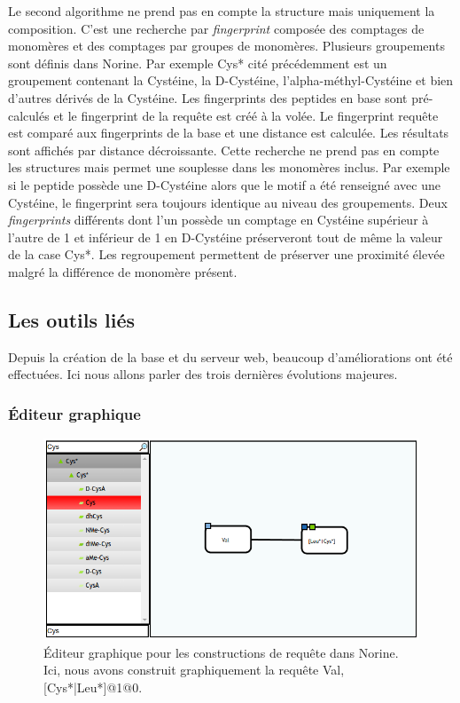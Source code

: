 Le second algorithme ne prend pas en compte la structure mais uniquement la composition.
C'est une recherche par \textit{fingerprint} composée des comptages de monomères et des comptages par groupes de monomères.
Plusieurs groupements sont définis dans Norine.
Par exemple Cys* cité précédemment est un groupement contenant la Cystéine, la D-Cystéine, l'alpha-méthyl-Cystéine et bien d'autres dérivés de la Cystéine.
Les fingerprints des peptides en base sont pré-calculés et le fingerprint de la requête est créé à la volée.
Le fingerprint requête est comparé aux fingerprints de la base et une distance est calculée.
Les résultats sont affichés par distance décroissante.
Cette recherche ne prend pas en compte les structures mais permet une souplesse dans les monomères inclus.
Par exemple si le peptide possède une D-Cystéine alors que le motif a été renseigné avec une Cystéine, le fingerprint sera toujours identique au niveau des groupements.
Deux \textit{fingerprints} différents dont l'un possède un comptage en Cystéine supérieur à l'autre de 1 et inférieur de 1 en D-Cystéine préserveront tout de même la valeur de la case Cys*.
Les regroupement permettent de préserver une proximité élevée malgré la différence de monomère présent.



\subsection{Les outils liés}

Depuis la création de la base et du serveur web, beaucoup d'améliorations ont été effectuées.
Ici nous allons parler des trois dernières évolutions majeures.


\subsubsection{Éditeur graphique}

\begin{figure}[h!]
  \begin{center}
    \includegraphics[width=450px]{Figures/Norine/editor.png}
    \caption{\label{editor}Éditeur graphique pour les constructions de requête dans Norine.
    Ici, nous avons construit graphiquement la requête Val,[Cys*|Leu*]@1@0.}
  \end{center}
\end{figure}

